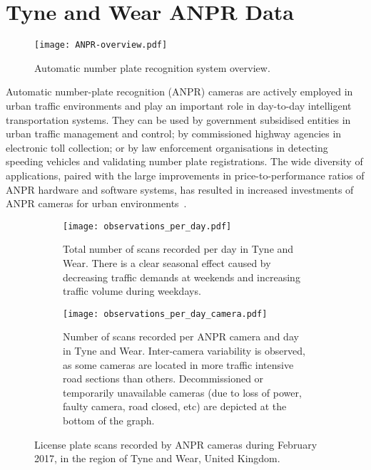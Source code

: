 \section{Tyne and Wear ANPR Data}\label{s.ncl}

\begin{figure}[t]
\centering
\texttt{[image: ANPR-overview.pdf]}
\caption{Automatic number plate recognition system overview.}
\label{fig:anpr-overview}
\end{figure}

Automatic number-plate recognition (ANPR) cameras are actively employed in urban traffic environments and play an important role in day-to-day intelligent transportation systems. They can be used by government subsidised entities in urban traffic management and control; by commissioned highway agencies in electronic toll collection; or by law enforcement organisations in detecting speeding vehicles and validating number plate registrations. The wide diversity of applications, paired with the large improvements in price-to-performance ratios of ANPR hardware and software systems, has resulted in increased investments of ANPR cameras for urban environments~\cite{EvolutionUTMC2013, SurveyITS2011}.

\begin{figure*}[t]
\centering
\begin{subfigure}[t]{.48\textwidth}
  \centering
  \texttt{[image: observations\_per\_day.pdf]}
  \caption{Total number of scans recorded per day in Tyne and Wear. There is a clear seasonal effect caused by decreasing traffic demands at weekends and increasing traffic volume during weekdays.}
  \label{fig:observations-per-day}
\end{subfigure}\hfill
\begin{subfigure}[t]{.48\textwidth}
  \centering
  \texttt{[image: observations\_per\_day\_camera.pdf]}
  \caption{Number of scans recorded per ANPR camera and day in Tyne and Wear. Inter-camera variability is observed, as some cameras are located in more traffic intensive road sections than others. Decommissioned or temporarily unavailable cameras (due to loss of power, faulty camera, road closed, etc) are depicted at the bottom of the graph.}
  \label{fig:observations-per-camera-day}
\end{subfigure}
\caption{License plate scans recorded by ANPR cameras during February 2017, in the region of Tyne and Wear, United Kingdom.}
\label{fig:time-series}
\end{figure*}

